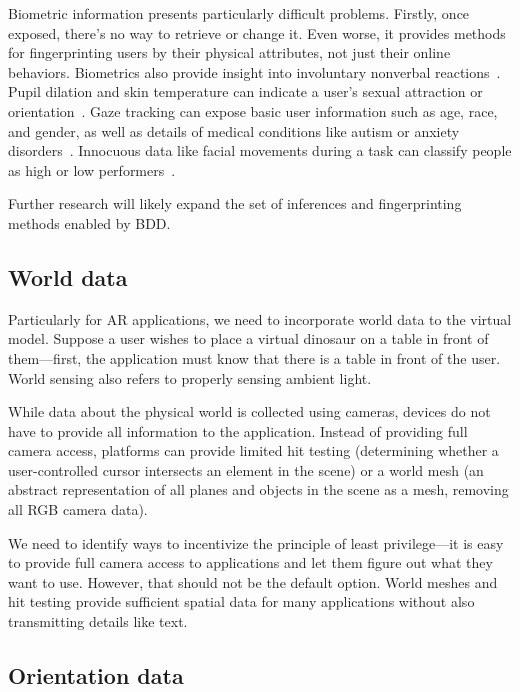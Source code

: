 Biometric information presents particularly difficult problems. Firstly, once exposed, there's no way to retrieve or change it. Even worse, it provides methods for fingerprinting users by their physical attributes, not just their online behaviors. Biometrics also provide insight into involuntary nonverbal reactions~\cite{bailenson2018protecting}. Pupil dilation and skin temperature can indicate a user's sexual attraction or orientation~\cite{bolmont2014love}. Gaze tracking can expose basic user information such as age, race, and gender, as well as details of medical conditions like autism or anxiety disorders~\cite{liebling2014privacy}. Innocuous data like facial movements during a task can classify people as high or low performers~\cite{jabon2011automatically}.

Further research will likely expand the set of inferences and fingerprinting methods enabled by BDD.

\subsection{World data}

Particularly for AR applications, we need to incorporate world data to the virtual model. Suppose a user wishes to place a virtual dinosaur on a table in front of them---first, the application must know that there is a table in front of the user. World sensing also refers to properly sensing ambient light.

While data about the physical world is collected using cameras, devices do not have to provide all information to the application. Instead of providing full camera access, platforms can provide limited hit testing (determining whether a user-controlled cursor intersects an element in the scene) or a world mesh (an abstract representation of all planes and objects in the scene as a mesh, removing all RGB camera data).

We need to identify ways to incentivize the principle of least privilege---it is easy to provide full camera access to applications and let them figure out what they want to use. However, that should not be the default option. World meshes and hit testing provide sufficient spatial data for many applications without also transmitting details like text.

\subsection{Orientation data}

